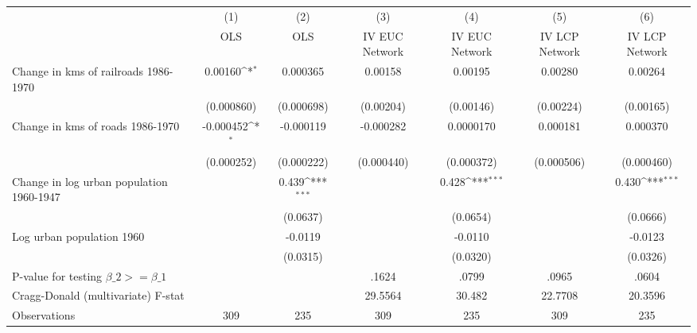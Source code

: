 {
\def\sym#1{\ifmmode^{#1}\else\(^{#1}\)\fi}
\begin{tabular}{l*{6}{c}}
\hline\hline
                &\multicolumn{1}{c}{(1)}&\multicolumn{1}{c}{(2)}&\multicolumn{1}{c}{(3)}&\multicolumn{1}{c}{(4)}&\multicolumn{1}{c}{(5)}&\multicolumn{1}{c}{(6)}\\
                &\multicolumn{1}{c}{OLS}&\multicolumn{1}{c}{OLS}&\multicolumn{1}{c}{IV EUC Network}&\multicolumn{1}{c}{IV EUC Network}&\multicolumn{1}{c}{IV LCP Network}&\multicolumn{1}{c}{IV LCP Network}\\
\hline
Change in kms of railroads 1986-1970&  0.00160\sym{*}  & 0.000365         &  0.00158         &  0.00195         &  0.00280         &  0.00264         \\
                &(0.000860)         &(0.000698)         &(0.00204)         &(0.00146)         &(0.00224)         &(0.00165)         \\
[1em]
Change in kms of roads 1986-1970&-0.000452\sym{*}  &-0.000119         &-0.000282         &0.0000170         & 0.000181         & 0.000370         \\
                &(0.000252)         &(0.000222)         &(0.000440)         &(0.000372)         &(0.000506)         &(0.000460)         \\
[1em]
Change in log urban population 1960-1947&                  &    0.439\sym{***}&                  &    0.428\sym{***}&                  &    0.430\sym{***}\\
                &                  & (0.0637)         &                  & (0.0654)         &                  & (0.0666)         \\
[1em]
Log urban population 1960&                  &  -0.0119         &                  &  -0.0110         &                  &  -0.0123         \\
                &                  & (0.0315)         &                  & (0.0320)         &                  & (0.0326)         \\
\hline
P-value for testing $\beta\_{2} >= \beta\_{1}$&                  &                  &    .1624         &    .0799         &    .0965         &    .0604         \\
Cragg-Donald (multivariate) F-stat&                  &                  &  29.5564         &   30.482         &  22.7708         &  20.3596         \\
Observations    &      309         &      235         &      309         &      235         &      309         &      235         \\
\hline\hline
\end{tabular}
}

